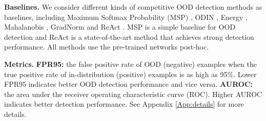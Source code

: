 \documentclass{article}
\begin{document}
\textbf{Baselines.} We consider different kinds of competitive OOD detection methods as baselines, including Maximum Softmax Probability (MSP) \cite{hendrycks17baseline}, ODIN \cite{ODIN}, Energy \cite{liu2020energy}, Mahalanobis \cite{Mahalanobis}, GradNorm \cite{huang2021importance} and ReAct \cite{sun2021react}. MSP is a simple baseline for OOD detection and ReAct is a state-of-the-art method that achieves strong detection performance. All methods use the pre-trained networks post-hoc.

\textbf{Metrics.} \textbf{FPR95:} the false positive rate of OOD (negative) examples when the true positive rate of in-distribution (positive) examples is as high as 95$\%$. Lower FPR95 indicates better OOD detection performance and {vice versa}. \textbf{AUROC:} the area under the receiver operating characteristic curve (ROC). Higher AUROC indicates better detection performance.
See Appendix \ref{App:details} for more details.
\end{document}
